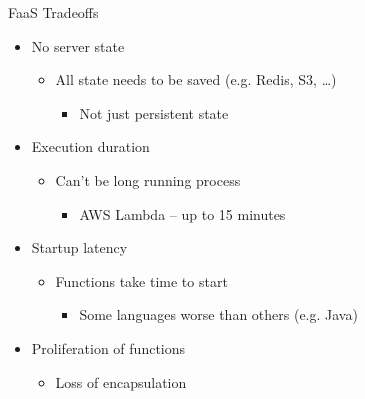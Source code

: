 \documentclass{slide}
\begin{document}
\begin{frame}{FaaS Tradeoffs}
\vspace{1pt}
{\huge
\begin{itemize}
    \item<1-> No server state
    \vspace{5pt}
    \begin{itemize}
        \LARGE\item All state needs to be saved (e.g. Redis, S3, \dots)
        \begin{itemize}
            \Large\item Not just persistent state
        \end{itemize}
    \end{itemize}
    \vspace{1mm}
    \item<2-> Execution duration
    \vspace{4pt}
    \begin{itemize}
        \LARGE\item Can't be long running process
        \begin{itemize}
            \Large\item AWS Lambda -- up to 15 minutes
        \end{itemize}
    \end{itemize}
    \vspace{1mm}
    \item<3-> Startup latency
    \vspace{2pt}
    \begin{itemize}
        \LARGE\item Functions take time to start
        \begin{itemize}
            \Large\item Some languages worse than others (e.g. Java)
        \end{itemize}
    \end{itemize}
    \vspace{1mm}
    \item<4-> Proliferation of functions
    \vspace{-4pt}
    \begin{itemize}
        \LARGE\item Loss of encapsulation
    \end{itemize}
\end{itemize}
}
\end{frame}
\end{document}
